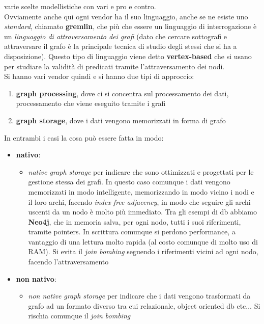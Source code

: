 \documentclass[a4paper,12pt, oneside]{book}
\begin{document}
varie scelte modellistiche con vari e pro e contro.\\
Ovviamente anche qui ogni vendor ha il suo linguaggio, anche se ne esiste uno
\textit{standard}, chiamato \textbf{gremlin}, che più che essere un linguaggio
di interrogazione è un \textit{linguaggio di attraversamento dei grafi} (dato
che cercare sottografi e attraversare il grafo è la principale tecnica di studio
degli stessi che si ha a disposizione). Questo tipo di linguaggio viene detto
\textbf{vertex-based} che si usano per studiare la validità di predicati
tramite l'attraversamento dei nodi.\\
Si hanno vari vendor quindi e si hanno due tipi di approccio:
\begin{enumerate}
  \item \textbf{graph processing}, dove ci si concentra sul processamento dei
  dati, processamento che viene eseguito tramite i grafi 
  \item \textbf{graph storage}, dove i dati vengono memorizzati in forma di
  grafo 
\end{enumerate}
In entrambi i casi la cosa può essere fatta in modo:
\begin{itemize}
  \item \textbf{nativo}:
    \begin{itemize}
    \item \textit{native graph storage} per indicare che sono ottimizzati e
    progettati per le gestione stessa dei grafi. In questo caso comunque i dati
    vengono memorizzati in modo intelligente, memorizzando in modo vicino i nodi
    e il loro archi, facendo \textit{index free adjacency}, in modo che
    seguire gli archi uscenti da un nodo è molto più immediato. Tra gli esempi
    di db abbiamo \textbf{Neo4j}, che in memoria salva, per ogni nodo, tutti i
    suoi riferimenti, tramite pointers. In scrittura comunque si perdono
    performance, a vantaggio di una lettura molto rapida (al costo comunque di
    molto uso di RAM). Si evita il \textit{join bombing} seguendo i riferimenti
    vicini ad ogni nodo, facendo l'attraversamento
  \end{itemize}
  \item \textbf{non nativo}:
  \begin{itemize}
    \item \textit{non native graph storage} per indicare che i dati vengono
    trasformati da grafo ad un formato diverso tra cui relazionale, object
    oriented db etc$\ldots$ Si rischia comunque il \textit{join bombing}
  \end{itemize}
\end{itemize}
\end{document}
